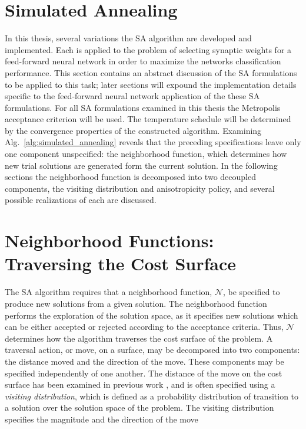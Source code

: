 \documentclass[11pt]{afthesis}
\begin{document}
	\section{Simulated Annealing}
	\label{scn:simulated_annealing}
	
	In this thesis, several variations the SA algorithm are developed and implemented. Each is applied to the problem of selecting synaptic weights for a feed-forward neural network in order to maximize the networks classification performance. This section contains an abstract discussion of the SA formulations to be applied to this task; later sections will expound the implementation details specific to the feed-forward neural network application of the these SA formulations. For all SA formulations examined in this thesis the Metropolis acceptance criterion will be used. The temperature schedule will be determined by the convergence properties of the constructed algorithm. Examining Alg.~\ref{alg:simulated_annealing} reveals that the preceding specifications leave only one component unspecified: the neighborhood function, which determines how new trial solutions are generated form the current solution. In the following sections the neighborhood function is decomposed into two decoupled components, the visiting distribution and anisotropicity policy, and several possible realizations of each are discussed.
	
	\section{Neighborhood Functions: Traversing the Cost Surface}
	
	The SA algorithm requires that a neighborhood function, \begin{math} \mathcal{N} \end{math}, be specified to produce new solutions from a given solution. The neighborhood function performs the exploration of the solution space, as it specifies new solutions which can be either accepted or rejected according to the acceptance criteria. Thus, \begin{math} \mathcal{N} \end{math} determines how the algorithm traverses the cost surface of the problem. A traversal action, or move, on a surface, may be decomposed into two components: the distance moved and the direction of the move. These components may be specified independently of one another. The distance of the move on the cost surface has been examined in previous work \cite{szu1987fastsimulatedannealing,tsallis1996generalizedsimulatedannealing,ingber1989veryfastsimulatedreannealing}, and is often specified using a \textit{visiting distribution}, which is defined as a probability distribution of transition to a solution over the solution space of the problem. The visiting distribution specifies the magnitude and the direction of the move
	
\end{document}
